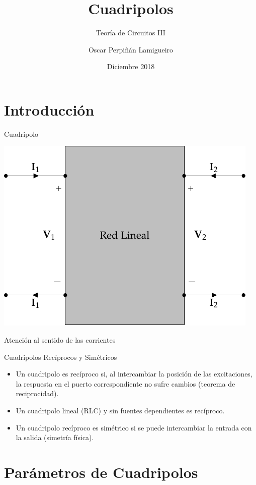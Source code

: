 \documentclass[xcolor={usenames,svgnames,dvipsnames}]{beamer}
\author{Oscar Perpiñán Lamigueiro}
\date{Diciembre 2018}
\title{Cuadripolos}
\subtitle{Teoría de Circuitos III}
\begin{document}
\maketitle

\section{Introducción}
\label{sec:org126df39}

\begin{frame}[label={sec:org4b549c6}]{Cuadripolo}
\begin{center}
\includegraphics[width=.9\linewidth]{../figs/cuadripolo.pdf}
\end{center}

\begin{center}
\alert{Atención al sentido de las corrientes}
\end{center}
\end{frame}
\begin{frame}[label={sec:org3661f0f}]{Cuadripolos Recíprocos y Simétricos}
\begin{itemize}
\item Un cuadripolo es \alert{recíproco} si, al intercambiar la posición de las excitaciones, la respuesta en el puerto correspondiente no sufre cambios (teorema de reciprocidad).
\item Un cuadripolo lineal (RLC) y \alert{sin fuentes dependientes} es recíproco.
\item Un \alert{cuadripolo recíproco es simétrico} si se puede intercambiar la entrada con la salida (simetría física).
\end{itemize}
\end{frame}
\section{Parámetros de Cuadripolos}
\label{sec:orgb72d75d}
\end{document}
